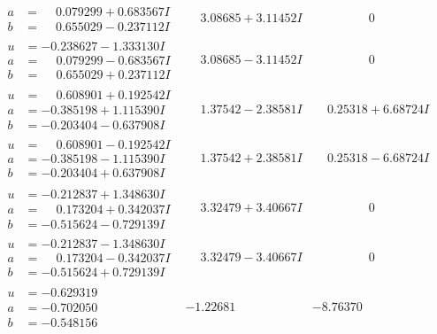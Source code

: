 \documentclass[1p]{elsarticle_modified}
\theoremstyle{definition}
\begin{document}
$$\begin{array}{c|c|c}
\begin{aligned}
a &= \phantom{-}0.079299 + 0.683567 I \\
b &= \phantom{-}0.655029 - 0.237112 I\end{aligned}
 & \phantom{-}3.08685 + 3.11452 I & \phantom{-0.000000 } 0 \\ \hline\begin{aligned}
u &= -0.238627 - 1.333130 I \\
a &= \phantom{-}0.079299 - 0.683567 I \\
b &= \phantom{-}0.655029 + 0.237112 I\end{aligned}
 & \phantom{-}3.08685 - 3.11452 I & \phantom{-0.000000 } 0 \\ \hline\begin{aligned}
u &= \phantom{-}0.608901 + 0.192542 I \\
a &= -0.385198 + 1.115390 I \\
b &= -0.203404 - 0.637908 I\end{aligned}
 & \phantom{-}1.37542 - 2.38581 I & \phantom{-}0.25318 + 6.68724 I \\ \hline\begin{aligned}
u &= \phantom{-}0.608901 - 0.192542 I \\
a &= -0.385198 - 1.115390 I \\
b &= -0.203404 + 0.637908 I\end{aligned}
 & \phantom{-}1.37542 + 2.38581 I & \phantom{-}0.25318 - 6.68724 I \\ \hline\begin{aligned}
u &= -0.212837 + 1.348630 I \\
a &= \phantom{-}0.173204 + 0.342037 I \\
b &= -0.515624 - 0.729139 I\end{aligned}
 & \phantom{-}3.32479 + 3.40667 I & \phantom{-0.000000 } 0 \\ \hline\begin{aligned}
u &= -0.212837 - 1.348630 I \\
a &= \phantom{-}0.173204 - 0.342037 I \\
b &= -0.515624 + 0.729139 I\end{aligned}
 & \phantom{-}3.32479 - 3.40667 I & \phantom{-0.000000 } 0 \\ \hline\begin{aligned}
u &= -0.629319\phantom{ +0.000000I} \\
a &= -0.702050\phantom{ +0.000000I} \\
b &= -0.548156\phantom{ +0.000000I}\end{aligned}
 & -1.22681\phantom{ +0.000000I} & -8.76370\phantom{ +0.000000I}\\

\end{array}$$
\end{document}
